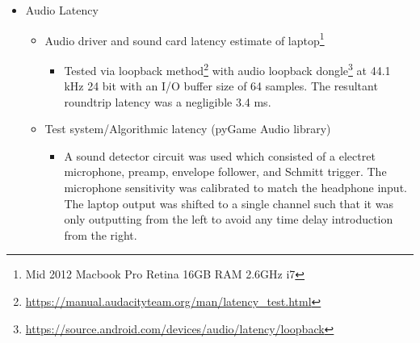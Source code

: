 \begin{itemize}
\begin{itemize}
        \begin{figure}[H]
            \centering
            \texttt{[image: diagramGateHaptic]}
            \caption{Diagram of gate versus actual onset}
        \end{figure}
        \begin{itemize}
            \item Onset trigger in continuous mode 2/9ths (5/9-3/9) of the period. For a 1000 ms period the onset transmission does not occur until 2/9 * 1000 = 222.222 ms as confirmed in Figure \ref{fig:hapticAdjustment}.
            \begin{figure}[H]
                \centering
                \texttt{[image: hapticAdjustment]}
                \caption{Haptic correction factor based on gate opening vs. actual onset message}
                \label{fig:hapticAdjustment}
            \end{figure}
            \item The onset trigger in discrete mode starts $1/4$ of a period after.
        \end{itemize}
    \end{itemize}
    \item Audio Latency
    \begin{itemize}
        \item Audio driver and sound card latency estimate of laptop\footnote{Mid 2012 Macbook Pro Retina 16GB RAM 2.6GHz i7}
        \begin{itemize}
            \item Tested via loopback method\footnote{\url{https://manual.audacityteam.org/man/latency_test.html}} with audio loopback dongle\footnote{\url{https://source.android.com/devices/audio/latency/loopback}} at 44.1 kHz 24 bit with an I/O buffer size of 64 samples. The resultant roundtrip latency was a negligible 3.4 ms.
        \end{itemize}
        \item Test system/Algorithmic latency (pyGame Audio library)
        \begin{itemize}
            \item A sound detector circuit was used which consisted of a electret microphone, preamp, envelope follower, and Schmitt trigger. The microphone sensitivity was calibrated to match the headphone input. The laptop output was shifted to a single channel such that it was only outputting from the left to avoid any time delay introduction from the right. 

\end{itemize}
\end{itemize}
\end{itemize}
